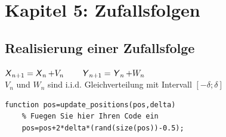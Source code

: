 \documentclass[deutsch]{latex4ei/latex4ei_sheet}
\begin{document}
\section{Kapitel 5: Zufallsfolgen}
\begin{sectionbox}
	\subsection{Realisierung einer Zufallsfolge}
	$\operatorname{\textsf{\textit{X}}}_{n+1}=\operatorname{\textsf{\textit{X}}}_n+V_n \qquad \operatorname{\textsf{\textit{Y}}}_{n+1}=\operatorname{\textsf{\textit{Y}}}_n+W_n$ \\
	$V_n$ und $W_n$ sind i.i.d. Gleichverteilung mit Intervall $[-\delta;\delta]$
	\begin{lstlisting}[gobble=4]
	function pos=update_positions(pos,delta)
	% Fuegen Sie hier Ihren Code ein
	pos=pos+2*delta*(rand(size(pos))-0.5);
	\end{lstlisting}
\end{sectionbox}


\end{document}
